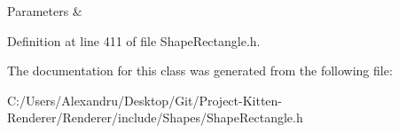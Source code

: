 \begin{DoxyParams}{Parameters}
{\em } & \\
\hline
\end{DoxyParams}


Definition at line 411 of file Shape\+Rectangle.\+h.



The documentation for this class was generated from the following file\+:\begin{DoxyCompactItemize}
\item 
C\+:/\+Users/\+Alexandru/\+Desktop/\+Git/\+Project-\/\+Kitten-\/\+Renderer/\+Renderer/include/\+Shapes/Shape\+Rectangle.\+h\end{DoxyCompactItemize}
